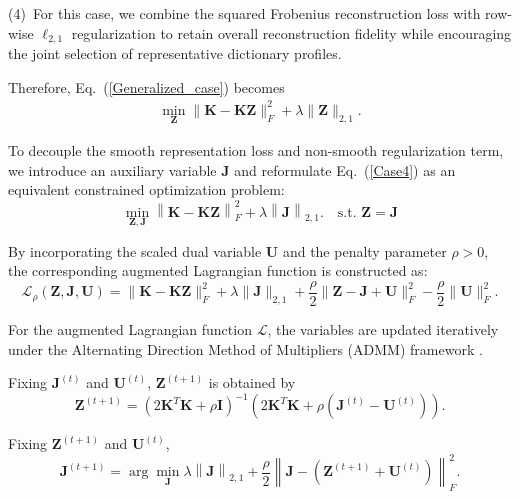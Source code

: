 \documentclass[ASNA,twocolumn]{USG} %
\begin{document}
(4)~For this case, we combine the squared Frobenius reconstruction loss with row-wise $\ell_{2,1}$ regularization to retain overall reconstruction fidelity while encouraging the joint selection of representative dictionary profiles.

Therefore, Eq.~(\ref{Generalized_case}) becomes 
\begin{eqnarray}\label{Case4}
	\min_{\boldsymbol{Z}}\|\boldsymbol{K}-\boldsymbol{K}\boldsymbol{Z}\|_{F}^2+\lambda\|\boldsymbol{Z}\|_{2,1}.
\end{eqnarray}

To decouple the smooth representation loss and non-smooth regularization term, we introduce an auxiliary variable $\boldsymbol{J}$ and reformulate Eq.~(\ref{Case4}) as an equivalent constrained optimization problem:
\begin{equation}
\min_{\boldsymbol{Z}, \boldsymbol{J}} \left\|\boldsymbol{K} - \boldsymbol{K} \boldsymbol{Z}\right\|_{F}^2 + \lambda \left\|\boldsymbol{J}\right\|_{2,1}. \quad \text{s.t. } \boldsymbol{Z} = \boldsymbol{J}
\end{equation}

By incorporating the scaled dual variable $\boldsymbol{U}$ and the penalty parameter $\rho > 0$, the corresponding augmented Lagrangian function is constructed as:
\begin{equation}
    \mathcal{L}_\rho(\boldsymbol{Z}, \boldsymbol{J}, \boldsymbol{U})=\|\boldsymbol{K}-\boldsymbol{K} \boldsymbol{Z}\|_F^2+\lambda\|\boldsymbol{J}\|_{2,1}+\frac{\rho}{2}\|\boldsymbol{Z}-\boldsymbol{J}+\boldsymbol{U}\|_F^2 -\frac{\rho}{2}\|\boldsymbol{U}\|_F^2.
\end{equation}

For the augmented Lagrangian function $\mathcal{L}$, the variables are updated iteratively under the Alternating Direction Method of Multipliers (ADMM) framework \cite{wei2012distributed}.

Fixing $\boldsymbol{J}^{(t)}$ and $\boldsymbol{U}^{(t)}$, $\boldsymbol{Z}^{(t+1)}$ is obtained by
\begin{equation}
\boldsymbol{Z}^{(t+1)} = \left( 2\boldsymbol{K}^T \boldsymbol{K} + \rho \boldsymbol{I} \right)^{-1} \left( 2\boldsymbol{K}^T \boldsymbol{K} + \rho(\boldsymbol{J}^{(t)} - \boldsymbol{U}^{(t)}) \right).
\end{equation}

Fixing $\boldsymbol{Z}^{(t+1)}$ and $\boldsymbol{U}^{(t)}$,
\begin{equation}
\boldsymbol{J}^{(t+1)} = \arg \min_{\boldsymbol{J}} \lambda \left\|\boldsymbol{J}\right\|_{2,1} + \frac{\rho}{2} \left\|\boldsymbol{J} - (\boldsymbol{Z}^{(t+1)} + \boldsymbol{U}^{(t)})\right\|_F^2.
\end{equation}
\end{document}
